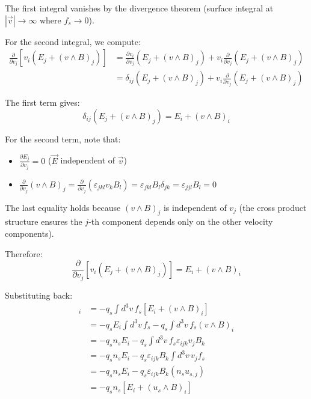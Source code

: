 The first integral vanishes by the divergence theorem (surface integral at $|\vec{v}| \to \infty$ where $f_s \to 0$).

For the second integral, we compute:
\begin{align*}
\frac{\partial}{\partial v_j}[v_i (E_j + (v \wedge B)_j)] &= \frac{\partial v_i}{\partial v_j}(E_j + (v \wedge B)_j) + v_i \frac{\partial}{\partial v_j}(E_j + (v \wedge B)_j)  \\
&= \delta_{ij}(E_j + (v \wedge B)_j) + v_i \frac{\partial}{\partial v_j}(E_j + (v \wedge B)_j)
\end{align*}

The first term gives:
\begin{equation*}
\delta_{ij}(E_j + (v \wedge B)_j) = E_i + (v \wedge B)_i
\end{equation*}

For the second term, note that:
\begin{itemize}
\item $\frac{\partial E_j}{\partial v_j} = 0$ \quad ($\vec{E}$ independent of $\vec{v}$)
\item $\frac{\partial}{\partial v_j}(v \wedge B)_j = \frac{\partial}{\partial v_j}(\varepsilon_{jkl} v_k B_l) = \varepsilon_{jkl} B_l \delta_{jk} = \varepsilon_{jjl} B_l = 0$
\end{itemize}

The last equality holds because $(v \wedge B)_j$ is independent of $v_j$ (the cross product structure ensures the $j$-th component depends only on the other velocity components).

Therefore:
\begin{equation*}
\frac{\partial}{\partial v_j}[v_i (E_j + (v \wedge B)_j)] = E_i + (v \wedge B)_i
\end{equation*}

Substituting back:
\begin{align*}
[\text{Term 3}]_i &= -q_s \int d^3v \, f_s [E_i + (v \wedge B)_i]  \\
&= -q_s E_i \int d^3v \, f_s - q_s \int d^3v \, f_s (v \wedge B)_i  \\
&= -q_s n_s E_i - q_s \int d^3v \, f_s \varepsilon_{ijk} v_j B_k  \\
&= -q_s n_s E_i - q_s \varepsilon_{ijk} B_k \int d^3v \, v_j f_s  \\
&= -q_s n_s E_i - q_s \varepsilon_{ijk} B_k (n_s u_{s,j})  \\
&= -q_s n_s [E_i + (u_s \wedge B)_i]
\end{align*}

